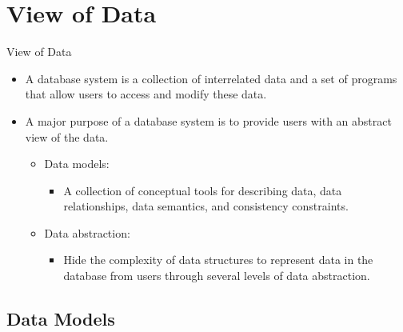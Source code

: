 \documentclass[aspectratio=169]{beamer}
\begin{document}
\section{View of Data}

\begin{frame}{View of Data}
    \begin{itemize}
        \item A database system is a collection of interrelated data and a set of programs that allow users to access and modify these data. 
        \item A major purpose of a database system is to provide users with an abstract view of the data.
        \begin{itemize}
            \item Data models:
            \begin{itemize}
                \item A collection of conceptual tools for describing data, data relationships, data semantics, and consistency constraints.
            \end{itemize}
            \item Data abstraction:
            \begin{itemize}
                \item Hide the complexity  of data structures to represent data in the database from users through several levels of data abstraction.
            \end{itemize}
        \end{itemize}
    \end{itemize}
\end{frame}

\subsection{Data Models}
\end{document}

